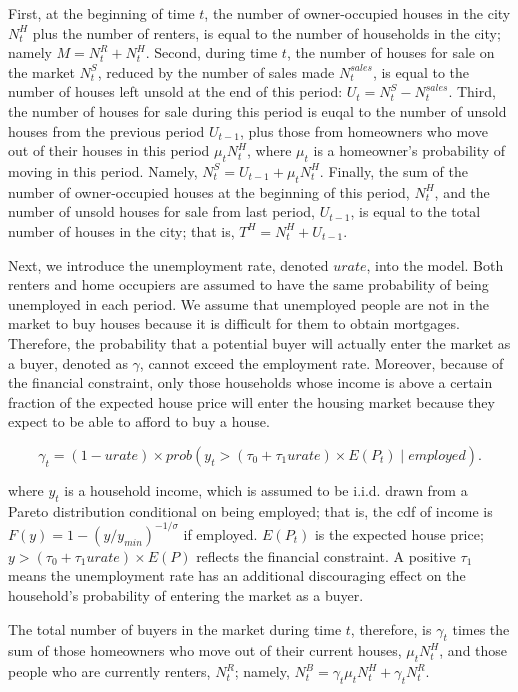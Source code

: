 First, at the beginning of time $t$, the number of owner-occupied houses in the city $N_t^{H}$ plus the number of renters, is equal to the number of households in the city; namely $M = N_t^R + N_t^H$. Second, during time $t$, the number of houses for sale on the market $N_t^S$, reduced by the number of sales made $N_t^{sales}$, is equal to the number of houses left unsold at the end of this period: $U_t = N_t^S - N_t^{sales}$. Third, the number of houses for sale during this period is euqal to the number of unsold houses from the previous period $U_{t-1}$, plus those from homeowners who move out of their houses in this period $\mu_t N_t^H$, where $\mu_t$ is a homeowner's probability of moving in this period. Namely, $N_t^S = U_{t - 1} + \mu_t N_t^H$. Finally, the sum of the number of owner-occupied houses at the beginning of this period, $N_t^H$, and the number of unsold houses for sale from last period, $U_{t - 1}$, is equal to the total number of houses in the city; that is, $T^H = N_t^H + U_{t - 1}$.

Next, we introduce the unemployment rate, denoted $urate$, into the model. Both renters and home occupiers are assumed to have the same probability of being unemployed in each period. We assume that unemployed people are not in the market to buy houses because it is difficult for them to obtain mortgages. Therefore, the probability that a potential buyer will actually enter the market as a buyer, denoted as $\gamma$, cannot exceed the employment rate. Moreover, because of the financial constraint, only those households whose income is above a certain fraction of the expected house price will enter the housing market because they expect to be able to afford to buy a house.

\begin{equation}
    \gamma_t = (1 - urate) \times prob(y_t > (\tau_0 + \tau_1 urate) \times E(P_t) \mid employed).
\end{equation}

where $y_t$ is a household income, which is assumed to be i.i.d. drawn from a Pareto distribution conditional on being employed; that is, the cdf of income is $F(y) = 1 - (y / y_{min})^{-1/\sigma}$ if employed. $E(P_t)$ is the expected house price; $y> (\tau_0 + \tau_1 urate) \times E(P)$ reflects the financial constraint. A positive $\tau_1$ means the unemployment rate has an additional discouraging effect on the household's probability of entering the market as a buyer.

The total number of buyers in the market during time $t$, therefore, is $\gamma_t$ times the sum of those homeowners who move out of their current houses, $\mu_t N_t^H$, and those people who are currently renters, $N_t^R$; namely, $N_t^B = \gamma_t \mu_t N_t^H + \gamma_t N_t^R$.

